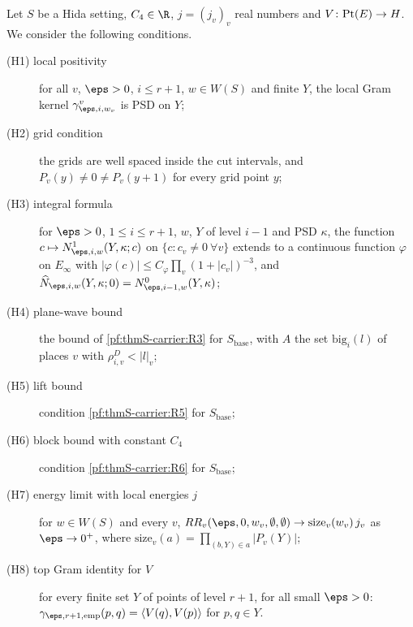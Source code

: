 \begin{definition}\label{pf:thmS-carrier:conds}
Let $S$ be a Hida setting, $C_4\in\R$, $j=(j_v)_v$ real numbers and $V\colon\mathrm{Pt}(E)\to H$. We consider the
following conditions.
\begin{description}
\item[(H1) local positivity] for all $v$, $\eps>0$, $i\le r+1$, $w\in W(S)$ and finite $Y$, the local Gram kernel
  $\gamma^v_{\eps,i,w_v}$ is PSD on $Y$;
\item[(H2) grid condition] the grids are well spaced inside the cut intervals, and $P_v(y)\ne0\ne P_v(y+1)$ for every
  grid point $y$;
\item[(H3) integral formula] for $\eps>0$, $1\le i\le r+1$, $w$, $Y$ of level $i-1$ and PSD $\kappa$, the function
  $c\mapsto N^1_{\eps,i,w}(Y,\kappa;c)$ on $\{c:c_v\ne0\ \forall v\}$ extends to a continuous function $\varphi$ on
  $E_\infty$ with $|\varphi(c)|\le C_\varphi\prod_v(1+|c_v|)^{-3}$, and
  $\thmScarrierNhat_{\eps,i,w}(Y,\kappa;0)=\thmScarrierNz_{\eps,i-1,w}(Y,\kappa)$;
\item[(H4) plane-wave bound] the bound of \ref{pf:thmS-carrier:R3} for $S_{\mathrm{base}}$, with $A$ the set
  $\mathrm{big}_i(l)$ of places $v$ with $\rho^D_{i,v}<|l|_v$;
\item[(H5) lift bound] condition \ref{pf:thmS-carrier:R5} for $S_{\mathrm{base}}$;
\item[(H6) block bound with constant $C_4$] condition \ref{pf:thmS-carrier:R6} for $S_{\mathrm{base}}$;
\item[(H7) energy limit with local energies $j$] for $w\in W(S)$ and every $v$,
  $RR_v(\eps,0,w_v,\emptyset,\emptyset)\to\mathrm{size}_v(w_v)\,j_v$ as $\eps\to0^+$, where
  $\mathrm{size}_v(a)=\prod_{(b,Y)\in a}|P_v(Y)|$;
\item[(H8) top Gram identity for $V$] for every finite set $Y$ of points of level $r+1$, for all small $\eps>0$:
  $\gamma_{\eps,r+1,\mathrm{emp}}(p,q)=\langle V(q),V(p)\rangle$ for $p,q\in Y$.
\end{description}
\end{definition}

